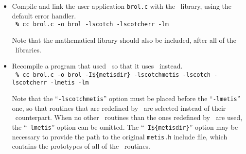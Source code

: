 \begin{itemize}

\item
Compile and link the user application \texttt{brol.c} with the \libscotch\ library,
using the default error handler.
\\

\noi
{\tt
{\bf\%} cc brol.c -o brol -lscotch -lscotcherr -lm}
\spa

\noi
Note that the mathematical library should also be included, after
all of the \scotch\ libraries.
\item
Recompile a program that used \metis\ so that it uses \scotch\ instead.
\\

\noi
{\tt
{\bf\%} cc brol.c -o brol -I\$\{metisdir\} -lscotchmetis -lscotch -lscotcherr -lmetis -lm}
\spa

\noi
Note that the ``\texttt{-lscotch\lbt metis}'' option must be placed before the
``\texttt{-lmetis}'' one, so that routines that are redefined by \scotch\ are
selected instead of their \metis\ counterpart. When no other
\metis\ routines than the ones redefined by \scotch\ are used, the
``\texttt{-lmetis}'' option can be omitted. The ``\texttt{-I\$\{metisdir\}}''
option may be necessary to provide the path to the original \texttt{metis.h}
include file, which contains the prototypes of all of the \metis\ routines.

\end{itemize}
